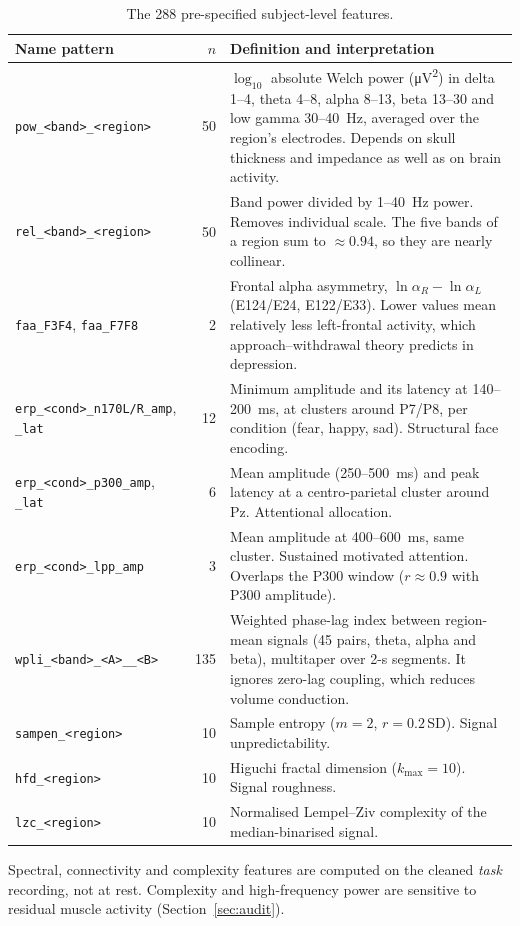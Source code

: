 \begin{table}[h]
\centering\scriptsize
\caption{The 288 pre-specified subject-level features.}
\label{tab:dictionary}
\begin{tabular}{@{}p{3.3cm}rp{9.2cm}@{}}
\toprule
Name pattern & $n$ & Definition and interpretation \\
\midrule
\texttt{pow\_<band>\_<region>} & 50 & $\log_{10}$ absolute Welch power (\si{\micro\volt\squared}) in delta 1--4, theta
  4--8, alpha 8--13, beta 13--30 and low gamma 30--40~Hz, averaged over the region's electrodes. Depends on skull
  thickness and impedance as well as on brain activity. \\
\texttt{rel\_<band>\_<region>} & 50 & Band power divided by 1--40~Hz power. Removes individual scale. The five
  bands of a region sum to $\approx0.94$, so they are nearly collinear. \\
\texttt{faa\_F3F4}, \texttt{faa\_F7F8} & 2 & Frontal alpha asymmetry, $\ln\alpha_R-\ln\alpha_L$ (E124/E24,
  E122/E33). Lower values mean relatively less left-frontal activity, which approach--withdrawal theory predicts in
  depression. \\
\texttt{erp\_<cond>\_n170L/R\_amp}, \texttt{\_lat} & 12 & Minimum amplitude and its latency at 140--200~ms, at
  clusters around P7/P8, per condition (fear, happy, sad). Structural face encoding. \\
\texttt{erp\_<cond>\_p300\_amp}, \texttt{\_lat} & 6 & Mean amplitude (250--500~ms) and peak latency at a
  centro-parietal cluster around Pz. Attentional allocation. \\
\texttt{erp\_<cond>\_lpp\_amp} & 3 & Mean amplitude at 400--600~ms, same cluster. Sustained motivated attention.
  Overlaps the P300 window ($r\approx0.9$ with P300 amplitude). \\
\texttt{wpli\_<band>\_<A>\_\_<B>} & 135 & Weighted phase-lag index between region-mean signals (45 pairs, theta,
  alpha and beta), multitaper over 2-s segments. It ignores zero-lag coupling, which reduces volume conduction. \\
\texttt{sampen\_<region>} & 10 & Sample entropy ($m=2$, $r=0.2$\,SD). Signal unpredictability. \\
\texttt{hfd\_<region>} & 10 & Higuchi fractal dimension ($k_\text{max}=10$). Signal roughness. \\
\texttt{lzc\_<region>} & 10 & Normalised Lempel--Ziv complexity of the median-binarised signal. \\
\bottomrule
\end{tabular}
\end{table}

Spectral, connectivity and complexity features are computed on the cleaned \emph{task} recording, not at rest.
Complexity and high-frequency power are sensitive to residual muscle activity (Section~\ref{sec:audit}).
